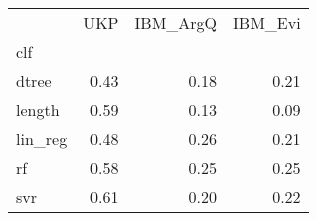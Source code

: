 \begin{tabular}{lrrr}
\toprule
{} &   UKP &  IBM\_ArgQ &  IBM\_Evi \\
clf     &       &           &          \\
\midrule
dtree   &  0.43 &      0.18 &     0.21 \\
length  &  0.59 &      0.13 &     0.09 \\
lin\_reg &  0.48 &      0.26 &     0.21 \\
rf      &  0.58 &      0.25 &     0.25 \\
svr     &  0.61 &      0.20 &     0.22 \\
\bottomrule
\end{tabular}
